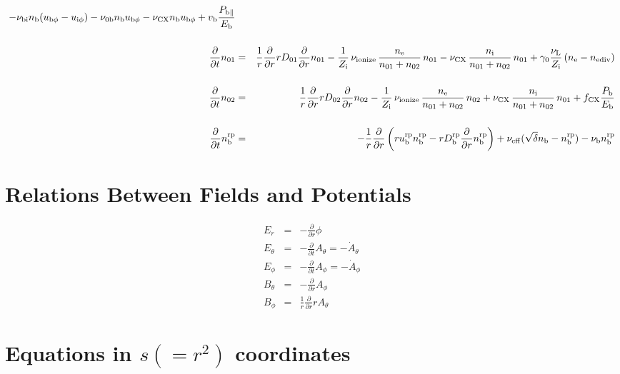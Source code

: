 \documentclass[11pt]{article}
\def\r#1{{\rm#1}}
\def\ddt{\frac{\partial}{\partial t}}
\def\ddr{\frac{\partial}{\partial r}}
\def\ne{n_\r{e}}
\def\ni{n_\r{i}}
\def\nb{n_\r{b}}
\def\uiph{u_{\r{i}\phi}}
\def\ubph{u_{\r{b}\phi}}
\def\Er{E_r}
\def\Eth{E_\theta}
\def\Eph{E_\phi}
\def\Bth{B_\theta}
\def\Bph{B_\phi}
\def\Athd{\dot{A}_\theta}
\def\Aphd{\dot{A}_\phi}
\def\Ath{A_\theta}
\def\Aph{A_\phi}
\def\nna{n_{01}}
\def\nnb{n_{02}}
\def\Zi{Z_\r{i}}
\def\Pb{P_\r{b}}
\def\Eb{E_\r{b}}
\def\nbrp{n_\r{b}^\r{rp}}
\def\Pbpara{P_{\r{b}\parallel}}
\def\nueff{\nu_\r{eff}}
\def\ubrp{u_\r{b}^\r{rp}}
\def\Dbrp{D_\r{b}^\r{rp}}
\def\fCX{f_\r{CX}}
\def\nubi{\nu_\r{bi}}
\def\nunb{\nu_\r{0b}}
\def\nuL{\nu_\r{L}}
\def\nuCX{\nu_\r{CX}}
\def\nuion{\nu_\r{ionize}}
\def\nub{\nu_\r{b}}
\def\vb{v_\r{b}}
\def\nediv{n_\r{ediv}}
\begin{document}
\begin{eqnarray}
%
  - \nubi \nb (\ubph - \uiph)
%
  - \nunb \nb \ubph
%
  - \nuCX \nb \ubph
%
  + \vb \frac{\Pbpara}{\Eb}
\\[5mm]
%
%
  \ddt \nna &=& 
%
    \frac{1}{r} \ddr r D_{01} \ddr \nna
%
  - \frac{1}{\Zi}\, \nuion\, \frac{\ne}{\nna+\nnb}\, \nna
%
  - \nuCX\, \frac{\ni}{\nna+\nnb}\, \nna
%
  + \gamma_0 \frac{\nuL}{\Zi} \, (\ne - \nediv)
\\[5mm]
%
%
  \ddt \nnb &=& 
%
    \frac{1}{r} \ddr r D_{02} \ddr \nnb
%
  - \frac{1}{\Zi}\, \nuion\, \frac{\ne}{\nna+\nnb}\, \nnb
%
  + \nuCX\, \frac{\ni}{\nna+\nnb}\, \nna
%
  + \fCX \frac{\Pb}{\Eb}
\\[5mm]
%
%
  \ddt \nbrp &=&
%
  - \frac{1}{r} \ddr \left( r \ubrp \nbrp - r \Dbrp \ddr \nbrp \right)
%
  + \nueff (\sqrt{\delta} \nb - \nbrp)
%
  - \nub \nbrp
%
\end{eqnarray}

\bigskip

\section{Relations Between Fields and Potentials}
\setcounter{equation}{0}

\begin{eqnarray}
%
%
  \Er &=&
%
  - \ddr \phi
\\[5mm]
%
%
  \Eth &=&
%
  - \ddt \Ath = - \Athd
\\[5mm]
%
%
  \Eph &=&
%
  - \ddt \Aph = - \Aphd
\\[5mm]
%
%
  \Bth &=&
%
  - \ddr \Aph
\\[5mm]
%
%
  \Bph &=&
%
  \frac{1}{r} \ddr r \Ath
\end{eqnarray}

\bigskip

\section{Equations in $s(=r^2)$ coordinates}
\setcounter{equation}{0}
\end{document}
